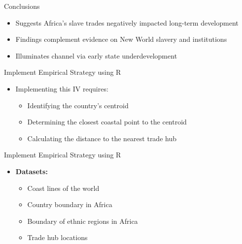 \documentclass[hyperref={pdfpagelabels=false}]{beamer}
\begin{document}
\begin{frame}{Conclusions}

\begin{itemize}
\item Suggests Africa's slave trades negatively impacted long-term development
	\vspace{0.2cm}
\item Findings complement evidence on New World slavery and institutions
	\vspace{0.2cm}
\item Illuminates channel via early state underdevelopment
\end{itemize}

\end{frame}




\begin{frame}{Implement Empirical Strategy using R}
		\begin{itemize}
		\item Implementing this IV requires:
			\vspace{0.2cm}
		\begin{itemize}
			\item Identifying the country's centroid
				\vspace{0.2cm}
			\item Determining the closest coastal point to the centroid
				\vspace{0.2cm}
			\item Calculating the distance to the nearest trade hub
		\end{itemize}
	\end{itemize}
	
\end{frame}


\begin{frame}{Implement Empirical Strategy using R}
\begin{itemize}
\item \textbf{Datasets:}
				\vspace{0.2cm}
\begin{itemize}
	\item Coast lines of the world
					\vspace{0.2cm}
	\item Country boundary in Africa
					\vspace{0.2cm}
	\item Boundary of ethnic regions in Africa
					\vspace{0.2cm}
	\item Trade hub locations
\end{itemize}
\end{itemize}
\end{frame}
\end{document}
